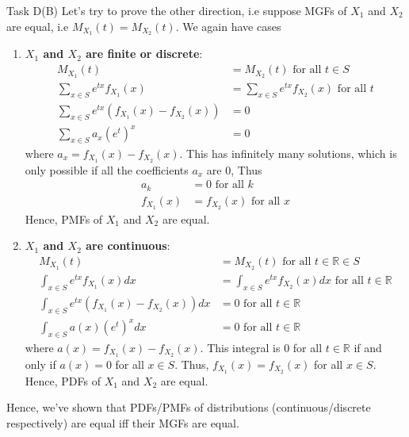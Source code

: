 \begin{task}{Task D(B)}
	Let's try to prove the other direction, i.e suppose MGFs of $X_1$ and
	$X_2$ are equal, i.e $M_{X_1}(t) = M_{X_2}(t)$. We again have cases
	\begin{enumerate}
		\item \textbf{$X_1$ and $X_2$ are finite or discrete}:
		      \begin{align}
			      M_{X_1}(t)                                     & = M_{X_2}(t) \text{ for all } t \in S               \\
			      \sum_{x\in S} e^{tx}f_{X_1}(x)                 & = \sum_{x\in S} e^{tx}f_{X_2}(x) \text{ for all } t \\
			      \sum_{x\in S} e^{tx} (f_{X_1}(x) - f_{X_2}(x)) & = 0                                                 \\
			      \sum_{x\in S} a_x(e^{t})^x                     & = 0
		      \end{align}
		      where $a_x=f_{X_1}(x)-f_{X_2}(x)$. This has infinitely many solutions, which is only possible if all the coefficients $a_x$ are 0, Thus
		      \begin{align}
			      a_k        & = 0 \text{ for all } k          \\
			      f_{X_1}(x) & = f_{X_2}(x) \text{ for all } x
		      \end{align}
		      Hence, PMFs of $X_1$ and $X_2$ are equal.

		\item \textbf{$X_1$ and $X_2$ are continuous}:
		      \begin{align}
			      M_{X_1}(t)                                       & = M_{X_2}(t) \text{ for all } t \in \mathbb{R} \in S                                   \\
			      \int_{x\in S} e^{tx}f_{X_1}(x)dx                 & = \int_{x\in S} e^{tx}f_{X_2}(x)dx \text{ for all } t \in \mathbb{R}                   \\
			      \int_{x\in S} e^{tx} (f_{X_1}(x) - f_{X_2}(x))dx & = 0                                                  \text{ for all } t \in \mathbb{R} \\
			      \int_{x\in S} a(x)(e^{t})^x                   dx & = 0\text{ for all } t\in \mathbb{R}
		      \end{align}
		      where $a(x)=f_{X_1}(x)-f_{X_2}(x)$. This integral is 0 for all $t\in \mathbb{R}$ if and only if $a(x) = 0$ for all $x\in S$. Thus, $f_{X_1}(x) = f_{X_2}(x)$ for all $x\in S$.
		      Hence, PDFs of $X_1$ and $X_2$ are equal.
	\end{enumerate}
	Hence, we've shown that PDFs/PMFs of distributions (continuous/discrete respectively) are equal iff their MGFs are equal.
\end{task}
